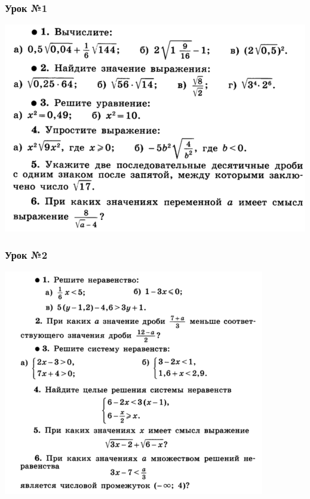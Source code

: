 \documentclass[algebra,a5paper]{pum}
\date{07.05.20}
\begin{document}
\subsubsection*{Урок №1}
\includegraphics[width=\textwidth]{img/19-1.png}

\subsubsection*{Урок №2}
\includegraphics[width=\textwidth]{img/19-2.png}
\end{document}
